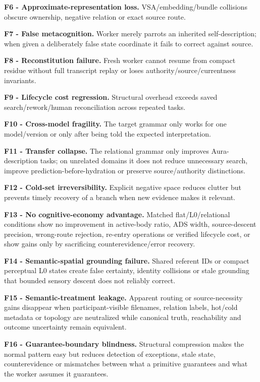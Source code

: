 \documentclass[
  10pt,
  letterpaper,
]{article}
\begin{document}
\textbf{F6 - Approximate-representation loss.} VSA/embedding/bundle
collisions obscure ownership, negative relation or exact source route.

\textbf{F7 - False metacognition.} Worker merely parrots an inherited
self-description; when given a deliberately false state coordinate it
fails to correct against source.

\textbf{F8 - Reconstitution failure.} Fresh worker cannot resume from
compact residue without full transcript replay or loses
authority/source/currentness invariants.

\textbf{F9 - Lifecycle cost regression.} Structural overhead exceeds
saved search/rework/human reconciliation across repeated tasks.

\textbf{F10 - Cross-model fragility.} The target grammar only works for
one model/version or only after being told the expected interpretation.

\textbf{F11 - Transfer collapse.} The relational grammar only improves
Aura-description tasks; on unrelated domains it does not reduce
unnecessary search, improve prediction-before-hydration or preserve
source/authority distinctions.

\textbf{F12 - Cold-set irreversibility.} Explicit negative space reduces
clutter but prevents timely recovery of a branch when new evidence makes
it relevant.

\textbf{F13 - No cognitive-economy advantage.} Matched
flat/L0/relational conditions show no improvement in active-body ratio,
ADS width, source-descent precision, wrong-route rejection, re-entry
operations or verified lifecycle cost, or show gains only by sacrificing
counterevidence/error recovery.

\textbf{F14 - Semantic-spatial grounding failure.} Shared referent IDs
or compact perceptual L0 states create false certainty, identity
collisions or stale grounding that bounded sensory descent does not
reliably correct.

\textbf{F15 - Semantic-treatment leakage.} Apparent routing or
source-necessity gains disappear when participant-visible filenames,
relation labels, hot/cold metadata or topology are neutralized while
canonical truth, reachability and outcome uncertainty remain equivalent.

\textbf{F16 - Guarantee-boundary blindness.} Structural compression
makes the normal pattern easy but reduces detection of exceptions, stale
state, counterevidence or mismatches between what a primitive guarantees
and what the worker assumes it guarantees.
\end{document}
